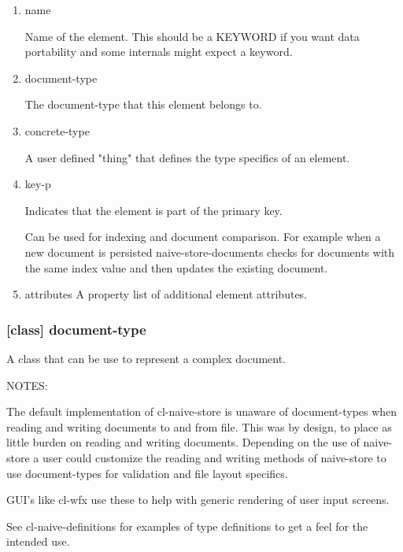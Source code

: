 \documentclass[11pt]{article}
\begin{document}
\begin{enumerate}
\item\relax [accessor] name
\label{sec:org527212b}

Name of the element. This should be a KEYWORD if you want data
portability and some internals might expect a keyword.

\item\relax [accessor] document-type
\label{sec:org6eb0d74}

The document-type that this element belongs to.

\item\relax [accessor] concrete-type
\label{sec:orgdd55121}

A user defined "thing" that defines the type specifics of an element.

\item\relax [accessor] key-p
\label{sec:orga0d8568}

Indicates that the element is part of the primary key.

Can be used for indexing and document comparison. For example when a
new document is persisted naive-store-documents checks for documents
with the same index value and then updates the existing document.

\item\relax [accessor] attributes
\label{sec:org0c1b372}
A property list of additional element attributes.
\end{enumerate}

\subsubsection{[class] document-type}
\label{sec:orgd99b095}

A class that can be use to represent a complex document.

NOTES:

The default implementation of cl-naive-store is unaware of
document-types when reading and writing documents to and from
file. This was by design, to place as little burden on reading and
writing documents. Depending on the use of naive-store a user could
customize the reading and writing methods of naive-store to use
document-types for validation and file layout specifics.

GUI's like cl-wfx use these to help with generic rendering of user
input screens.

See cl-naive-definitions for examples of type
definitions to get a feel for the intended use.
\end{document}
